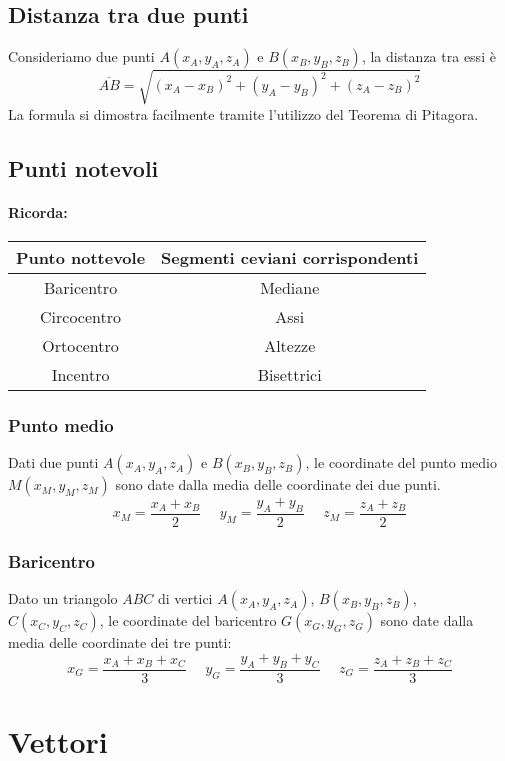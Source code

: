 \documentclass{article}     %
\begin{document}
        \subsection{Distanza tra due punti}
            Consideriamo due punti $A(x_A,y_A,z_A)$ e $B(x_B,y_B,z_B)$, la distanza tra essi è \[ \overline{AB}=\sqrt{(x_A-x_B)^2+(y_A-y_B)^2+(z_A-z_B)^2}\]
            La formula si dimostra facilmente tramite l'utilizzo del Teorema di Pitagora.

        \subsection{Punti notevoli}
            \paragraph*{Ricorda:}
                \begin{tabular}[h]{|c|c|}
                    \hline
                    Punto nottevole & Segmenti ceviani corrispondenti\\
                    \hline \hline
                    Baricentro & Mediane\\ \hline
                    Circocentro & Assi\\ \hline
                    Ortocentro & Altezze\\ \hline
                    Incentro & Bisettrici \\ \hline
                \end{tabular}
            \subsubsection{Punto medio}
                Dati due punti $A(x_A,y_A,z_A)$ e $B(x_B,y_B,z_B)$, le coordinate del punto medio $M(x_M, y_M, z_M)$ sono date dalla media delle coordinate dei due punti.
                \[x_M=\frac{x_A+x_B}{2}~~~~~~y_M=\frac{y_A+y_B}{2}~~~~~~z_M=\frac{z_A+z_B}{2}\]
            \subsubsection{Baricentro}
                Dato un triangolo $ABC$ di vertici $A(x_A,y_A,z_A)$, $B(x_B,y_B,z_B)$, $C(x_C,y_C,z_C)$, le coordinate del baricentro $G(x_G,y_G,z_G)$ sono date dalla media delle coordinate dei tre punti:
                \[x_G=\frac{x_A+x_B+x_C}{3}~~~~~~y_G=\frac{y_A+y_B+y_C}{3}~~~~~~z_G=\frac{z_A+z_B+z_C}{3}\]

    \section{Vettori}
\end{document}
